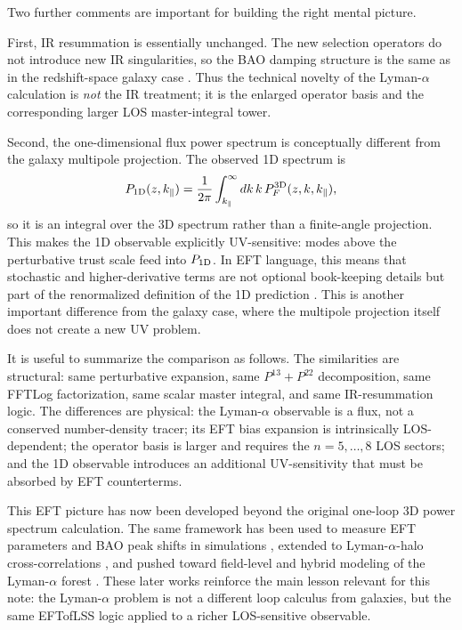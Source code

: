 \documentclass[a4paper,11pt]{article}
\renewcommand{\emph}[1]{\textit{#1}}
\newcommand{\<}{\langle}
\renewcommand{\>}{\rangle}
\begin{document}
Two further comments are important for building the right mental picture.

First, IR resummation is essentially unchanged. The new selection operators do not
introduce new IR singularities, so the BAO damping structure is the same as in the
redshift-space galaxy case \cite{Ivanov:2023yla}. Thus the technical novelty of the
Lyman-\(\alpha\) calculation is \emph{not} the IR treatment; it is the enlarged
operator basis and the corresponding larger LOS master-integral tower.

Second, the one-dimensional flux power spectrum is conceptually different from the
galaxy multipole projection. The observed 1D spectrum is
\begin{equation}
P_{1{\rm D}}(z,k_\parallel)
=
\frac{1}{2\pi}
\int_{k_\parallel}^{\infty} dk\,k\,P_F^{3{\rm D}}(z,k,k_\parallel),
\label{eq:lya_p1d_note}
\end{equation}
so it is an integral over the 3D spectrum rather than a finite-angle projection.
This makes the 1D observable explicitly UV-sensitive: modes above the perturbative
trust scale feed into \(P_{1{\rm D}}\). In EFT language, this means that stochastic
and higher-derivative terms are not optional book-keeping details but part of the
renormalized definition of the 1D prediction \cite{Ivanov:2023yla}. This is another
important difference from the galaxy case, where the multipole projection itself
does not create a new UV problem.

It is useful to summarize the comparison as follows. The similarities are structural:
same perturbative expansion, same \(P^{13}+P^{22}\) decomposition, same FFTLog
factorization, same scalar master integral, and same IR-resummation logic. The
differences are physical: the Lyman-\(\alpha\) observable is a flux, not a conserved
number-density tracer; its EFT bias expansion is intrinsically LOS-dependent; the
operator basis is larger and requires the \(n=5,\ldots,8\) LOS sectors; and the 1D
observable introduces an additional UV-sensitivity that must be absorbed by EFT
counterterms.

This EFT picture has now been developed beyond the original one-loop 3D power
spectrum calculation. The same framework has been used to measure EFT parameters and
BAO peak shifts in simulations \cite{deBelsunce:2024rvv}, extended to
Lyman-\(\alpha\)-halo cross-correlations \cite{Chudaykin:2025gsh}, and pushed toward
field-level and hybrid modeling of the Lyman-\(\alpha\) forest
\cite{deBelsunce:2025bqc,deBelsunce:2025gci}. These later works reinforce the main
lesson relevant for this note: the Lyman-\(\alpha\) problem is not a different loop
calculus from galaxies, but the same EFTofLSS logic applied to a richer LOS-sensitive
observable.
\end{document}
